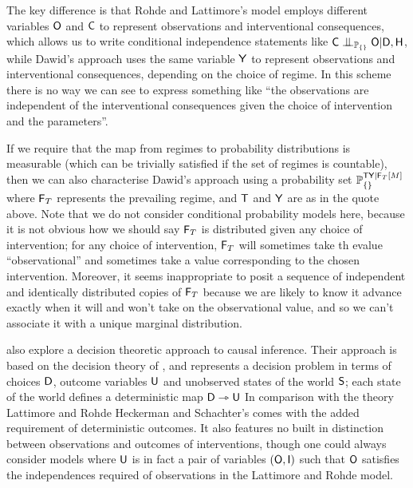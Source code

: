 The key difference is that Rohde and Lattimore's model employs different variables $\mathsf{O}$ and $\mathsf{C}$ to represent observations and interventional consequences, which allows us to write conditional independence statements like $\RV{C}\CI_{\prob{P}_{\{\}}} \RV{O}|\RV{D},\RV{H}$, while Dawid's approach uses the same variable $\mathsf{Y}$ to represent observations and interventional consequences, depending on the choice of regime. In this scheme there is no way we can see to express something like ``the observations are independent of the interventional consequences given the choice of intervention and the parameters''. 

If we require that the map from regimes to probability distributions is measurable (which can be trivially satisfied if the set of regimes is countable), then we can also characterise Dawid's approach using a probability set $\mathbb{P}_{\{\}}^{\mathsf{TY}|\mathsf{F}_T[M]}$ where $\mathsf{F}_T$ represents the prevailing regime, and $\mathsf{T}$ and $\mathsf{Y}$ are as in the quote above. Note that we do not consider conditional probability models here, because it is not obvious how we should say $\mathsf{F}_T$ is distributed given any choice of intervention; for any choice of intervention, $\mathsf{F}_T$ will sometimes take th evalue ``observational'' and sometimes take a value corresponding to the chosen intervention. Moreover, it seems inappropriate to posit a sequence of independent and identically distributed copies of $\mathsf{F}_T$ because we are likely to know it advance exactly when it will and won't take on the observational value, and so we can't associate it with a unique marginal distribution.

\citet{heckerman_decision-theoretic_1995} also explore a decision theoretic approach to causal inference. Their approach is based on the decision theory of \citet{savage_foundations_1954}, and represents a decision problem in terms of choices $\mathsf{D}$, outcome variables $\mathsf{U}$ and unobserved states of the world $\mathsf{S}$; each state of the world defines a deterministic map $\mathsf{D}\rightarrowtriangle \mathsf{U}$ In comparison with the theory Lattimore and Rohde Heckerman and Schachter's comes with the added requirement of deterministic outcomes. It also features no built in distinction between observations and outcomes of interventions, though one could always consider models where $\mathsf{U}$ is in fact a pair of variables $(\mathsf{O},\mathsf{I})$ such that $\mathsf{O}$ satisfies the independences required of observations in the Lattimore and Rohde model.
